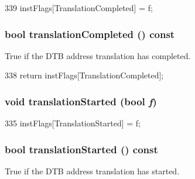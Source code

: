 \begin{DoxyCode}
339 { instFlags[TranslationCompleted] = f; }
\end{DoxyCode}
\hypertarget{classBaseDynInst_acb5aa3bab9bbe5a26aeaab77f3abe4be}{
\subsubsection[{translationCompleted}]{\setlength{\rightskip}{0pt plus 5cm}bool translationCompleted () const}}
\label{classBaseDynInst_acb5aa3bab9bbe5a26aeaab77f3abe4be}
True if the DTB address translation has completed. 


\begin{DoxyCode}
338 { return instFlags[TranslationCompleted]; }
\end{DoxyCode}
\hypertarget{classBaseDynInst_a68a56d88dcbcb5d039c94d7891edcbf7}{
\subsubsection[{translationStarted}]{\setlength{\rightskip}{0pt plus 5cm}void translationStarted (bool {\em f})}}
\label{classBaseDynInst_a68a56d88dcbcb5d039c94d7891edcbf7}



\begin{DoxyCode}
335 { instFlags[TranslationStarted] = f; }
\end{DoxyCode}
\hypertarget{classBaseDynInst_ac97dc97e71471789910132e3a3ce0949}{
\subsubsection[{translationStarted}]{\setlength{\rightskip}{0pt plus 5cm}bool translationStarted () const}}
\label{classBaseDynInst_ac97dc97e71471789910132e3a3ce0949}
True if the DTB address translation has started. 


